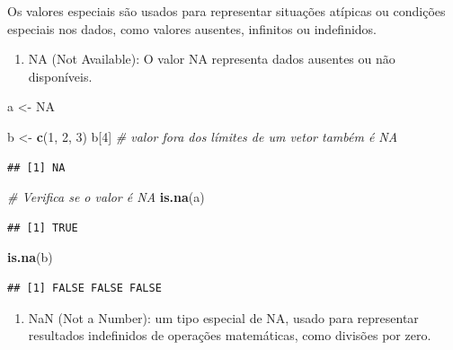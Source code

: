 \documentclass[
]{book}
\newenvironment{Shaded}{\begin{snugshade}}{\end{snugshade}}
\newcommand{\CommentTok}[1]{\textcolor[rgb]{0.56,0.35,0.01}{\textit{#1}}}
\newcommand{\ConstantTok}[1]{\textcolor[rgb]{0.56,0.35,0.01}{#1}}
\newcommand{\DecValTok}[1]{\textcolor[rgb]{0.00,0.00,0.81}{#1}}
\newcommand{\FunctionTok}[1]{\textcolor[rgb]{0.13,0.29,0.53}{\textbf{#1}}}
\newcommand{\NormalTok}[1]{#1}
\newcommand{\OtherTok}[1]{\textcolor[rgb]{0.56,0.35,0.01}{#1}}
\providecommand{\tightlist}{%
  \setlength{\itemsep}{0pt}\setlength{\parskip}{0pt}}
\begin{document}
Os valores especiais são usados para representar situações atípicas ou condições especiais nos dados, como valores ausentes, infinitos ou indefinidos.

\begin{enumerate}
\def\labelenumi{\arabic{enumi}.}
\tightlist
\item
  NA (Not Available): O valor NA representa dados ausentes ou não disponíveis.
\end{enumerate}

\begin{Shaded}
\begin{Highlighting}[]
\NormalTok{a }\OtherTok{\textless{}{-}} \ConstantTok{NA}

\NormalTok{b }\OtherTok{\textless{}{-}} \FunctionTok{c}\NormalTok{(}\DecValTok{1}\NormalTok{, }\DecValTok{2}\NormalTok{, }\DecValTok{3}\NormalTok{)}
\NormalTok{b[}\DecValTok{4}\NormalTok{] }\CommentTok{\# valor fora dos límites de um vetor também é NA}
\end{Highlighting}
\end{Shaded}

\begin{verbatim}
## [1] NA
\end{verbatim}

\begin{Shaded}
\begin{Highlighting}[]
\CommentTok{\# Verifica se o valor é NA}
\FunctionTok{is.na}\NormalTok{(a)}
\end{Highlighting}
\end{Shaded}

\begin{verbatim}
## [1] TRUE
\end{verbatim}

\begin{Shaded}
\begin{Highlighting}[]
\FunctionTok{is.na}\NormalTok{(b)}
\end{Highlighting}
\end{Shaded}

\begin{verbatim}
## [1] FALSE FALSE FALSE
\end{verbatim}

\begin{enumerate}
\def\labelenumi{\arabic{enumi}.}
\setcounter{enumi}{1}
\tightlist
\item
  NaN (Not a Number): um tipo especial de NA, usado para representar resultados indefinidos de operações matemáticas, como divisões por zero.
\end{enumerate}
\end{document}
